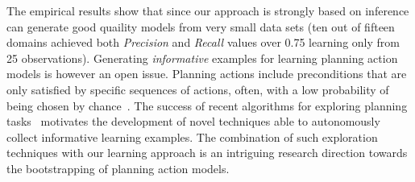 \documentclass{article}
\begin{document}
The empirical results show that since our approach is strongly based on inference can generate good quaility models from very small data sets (ten out of fifteen domains achieved both {\em Precision} and {\em Recall} values over 0.75 learning only from 25 observations). Generating {\em informative} examples for learning planning action models is however an open issue. Planning actions include preconditions that are only satisfied by specific sequences of actions, often, with a low probability of being chosen by chance~\cite{fern2004learning}. The success of recent algorithms for exploring planning tasks~\cite{geffner:novelty:IJCAI17} motivates the development of novel techniques able to autonomously collect informative learning examples. The combination of such exploration techniques with our learning approach is an intriguing research direction towards the bootstrapping of planning action models.





\newpage


\end{document}
